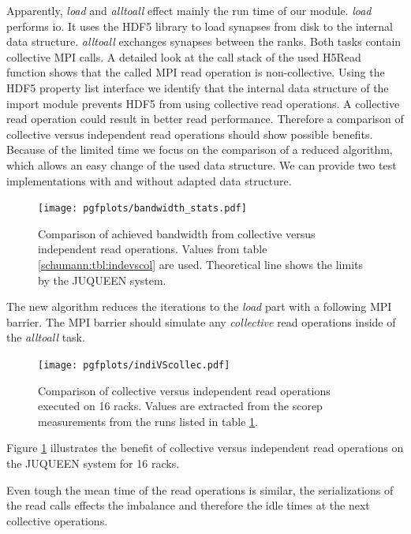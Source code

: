 Apparently, \emph{load} and \emph{alltoall} effect mainly the run time of our module.
\emph{load} performs io. It uses the HDF5 library to load synapses from disk to the internal data structure.
\emph{alltoall} exchanges synapses between the ranks. Both tasks contain collective MPI calls.
A detailed look at the call stack of the used H5Read function shows that the called MPI read operation is non-collective.
Using the HDF5 property list interface we identify that the internal data structure of the import module prevents HDF5 from using collective read operations.
A collective read operation could result in better read performance.
Therefore a comparison of collective versus independent read operations should show possible benefits.
Because of the limited time we focus on the comparison of a reduced algorithm,
which allows an easy change of the used data structure.
We can provide two test implementations with and without adapted data structure.
\begin{figure}[h!]
\begin{center}
 \texttt{[image: pgfplots/bandwidth\_stats.pdf]}
\end{center}
\caption{Comparison of achieved bandwidth from collective versus independent read operations.
 Values from table \ref{schumann:tbl:indevscol} are used. Theoretical line shows the limits by the
 JUQUEEN system.}
\end{figure}
The new algorithm reduces the iterations to the \emph{load} part with a following MPI barrier.
The MPI barrier should simulate any \emph{collective} read operations inside of the \emph{alltoall} task.
\begin{figure}[h!]
\begin{center}
 \texttt{[image: pgfplots/indiVScollec.pdf]}
\end{center}
\caption{Comparison of collective versus independent read operations executed on 16 racks.
 Values are extracted from the scorep measurements from the runs listed in table \ref{schumann:fig:indiVScollec}.}
 \label{schumann:fig:indiVScollec}
\end{figure}

Figure \ref{schumann:fig:indiVScollec} illustrates the benefit of collective versus independent read operations
on the JUQUEEN system for 16 racks.

Even tough the mean time of the read operations is similar, the serializations of the read calls effects the
imbalance and therefore the idle times at the next collective operations. 

